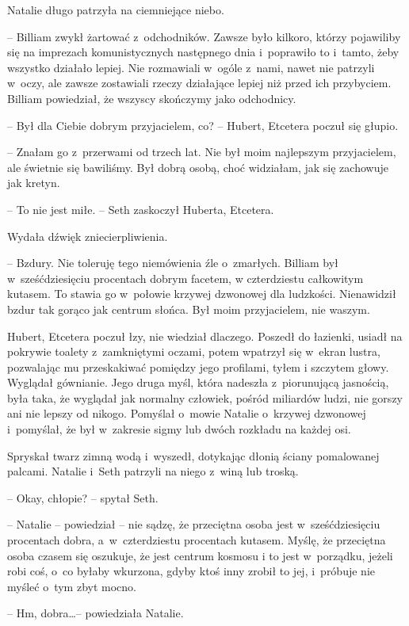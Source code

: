 \documentclass[oneside,polish,11pt,sfheadings]{mwbk}
\begin{document}
Natalie długo patrzyła na ciemniejące niebo. 

-- Billiam zwykł żartować z~odchodników. Zawsze było kilkoro, którzy pojawiliby się na imprezach
komunistycznych następnego dnia i~poprawiło to i~tamto, żeby wszystko
działało lepiej. Nie rozmawiali w~ogóle z~nami, nawet nie patrzyli w~oczy, ale zawsze zostawiali rzeczy działające lepiej niż przed ich
przybyciem. Billiam powiedział, że wszyscy skończymy jako odchodnicy.

-- Był dla Ciebie dobrym przyjacielem, co? -- Hubert, Etcetera poczuł się
głupio.

-- Znałam go z~przerwami od trzech lat. Nie był moim najlepszym
przyjacielem, ale świetnie się bawiliśmy. Był dobrą osobą, choć
widziałam, jak się zachowuje jak kretyn.

-- To nie jest miłe. -- Seth zaskoczył Huberta, Etcetera.

Wydała dźwięk zniecierpliwienia. 

-- Bzdury. Nie toleruję tego niemówienia
źle o~zmarłych. Billiam był w~sześćdziesięciu procentach dobrym facetem,
w czterdziestu całkowitym kutasem. To stawia go w~połowie krzywej
dzwonowej dla ludzkości. Nienawidził bzdur tak gorąco jak centrum
słońca. Był moim przyjacielem, nie waszym.

Hubert, Etcetera poczuł łzy, nie wiedział dlaczego. Poszedł do łazienki,
usiadł na pokrywie toalety z~zamkniętymi oczami, potem wpatrzył się w~ekran lustra, pozwalając mu przeskakiwać pomiędzy jego profilami, tyłem
i szczytem głowy. Wyglądał gównianie. Jego druga myśl, która nadeszła z~piorunującą jasnością, była taka, że wyglądał jak normalny człowiek,
pośród miliardów ludzi, nie gorszy ani nie lepszy od nikogo. Pomyślał o~mowie Natalie o~krzywej dzwonowej i~pomyślał, że był w~zakresie sigmy
lub dwóch rozkładu na każdej osi.

Spryskał twarz zimną wodą i~wyszedł, dotykając dłonią ściany pomalowanej
palcami. Natalie i~Seth patrzyli na niego z~winą lub troską.

-- Okay, chłopie? -- spytał Seth.

-- Natalie -- powiedział -- nie sądzę, że przeciętna osoba jest w~sześćdziesięciu procentach dobra, a~w~czterdziestu procentach kutasem.
Myślę, że przeciętna osoba czasem się oszukuje, że jest centrum kosmosu
i to jest w~porządku, jeżeli robi coś, o~co byłaby wkurzona, gdyby ktoś
inny zrobił to jej, i~próbuje nie myśleć o~tym zbyt mocno.

-- Hm, dobra\ldots  -- powiedziała Natalie.
\end{document}
